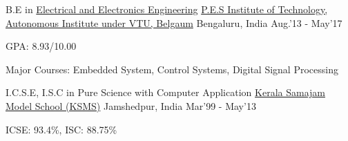 \begin{cventries}
	\cventry
	{B.E in \href{https://eee.pes.edu/}{Electrical and Electronics Engineering}}
	{\href{https://pesit.pes.edu/}{P.E.S Institute of Technology, Autonomous Institute under VTU, Belgaum}}
	{Bengaluru, India}
	{Aug.'13 - May'17}
	{
		\begin{cvitems}
		\item{GPA: 8.93/10.00}
		\item{Major Courses: Embedded System, Control Systems, Digital Signal Processing}
		\end{cvitems}
	}
\end{cventries}

\begin{cventries}
	\cventry
	{I.C.S.E, I.S.C in {Pure Science with Computer Application}}
	{\href{https://ksms.ac.in/}{Kerala Samajam Model School (KSMS)}}
	{Jamshedpur, India}
	{Mar'99 - May'13}
	{
		\begin{cvitems}
		\item{ICSE: 93.4\%, ISC: 88.75\%}
		\end{cvitems}
	}
\end{cventries}

